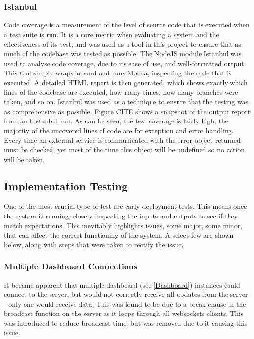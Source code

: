 \documentclass{article}
\begin{document}
\subsubsection{Istanbul}
Code coverage is a measurement of the level of source code that is executed when a test suite is run. It is a core metric when evaluating a system and the effectiveness of its test, and was used as a tool in this project to ensure that as much of the codebase was tested as possible. The NodeJS module Istanbul was used to analyse code coverage, due to its ease of use, and well-formatted output\cite{istanbul}. This tool simply wraps around and runs Mocha, inspecting the code that is executed. A detailed HTML report is then generated, which shows exactly which lines of the codebase are executed, how many times, how many branches were taken, and so on. Istanbul was used as a technique to ensure that the testing was as comprehensive as possible. Figure CITE shows a snapshot of the output report from an Instanbul run. As can be seen, the test coverage is fairly high; the majority of the uncovered lines of code are for exception and error handling. Every time an external service is communicated with the error object returned must be checked, yet most of the time this object will be undefined so no action will be taken.

\subsection{Implementation Testing}
One of the most crucial type of test are early deployment tests. This means once the system is running, closely inspecting the inputs and outputs to see if they match expectations. This inevitably highlights issues, some major, some minor, that can affect the correct functioning of the system. A select few are shown below, along with steps that were taken to rectify the issue.

\subsubsection{Multiple Dashboard Connections}
It became apparent that multiple dashboard (see \ref{Dashboard}) instances could connect to the server, but would not correctly receive all updates from the server - only one would receive data. This was found to be due to a break clause in the broadcast function on the server as it loops through all websockets clients. This was introduced to reduce broadcast time, but was removed due to it causing this issue.
\end{document}

